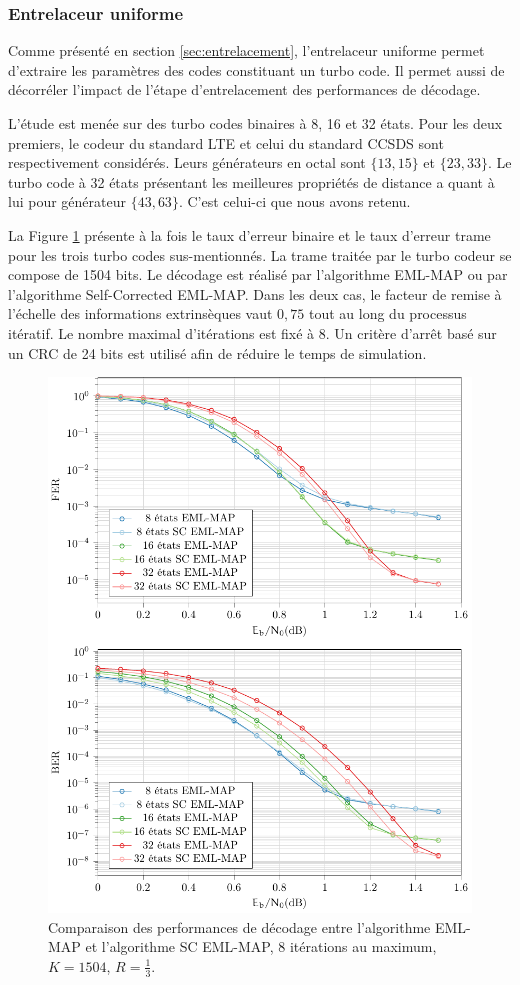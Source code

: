 \subsubsection{Entrelaceur uniforme}
Comme présenté en section \ref{sec:entrelacement}, l'entrelaceur uniforme permet d'extraire les paramètres des codes 
constituant un turbo code. Il permet aussi de décorréler l'impact de l'étape d'entrelacement des performances de 
décodage. 

L'étude est menée sur des turbo codes binaires à 8, 16 et 32 états. Pour les deux premiers, le codeur du standard LTE
et celui du standard CCSDS sont respectivement considérés. Leurs générateurs en octal sont $\{13,15\}$ et $\{23,33\}$. Le 
turbo code à 32 états présentant les meilleures propriétés de distance a quant à lui pour générateur $\{43,63\}$. C'est 
celui-ci que nous avons retenu.

La Figure \ref{fig:sc8it} présente à la fois le taux d'erreur binaire et le taux d'erreur trame pour les trois turbo 
codes sus-mentionnés. La trame traitée par le turbo codeur se compose de 1504 bits. Le décodage est réalisé par
l'algorithme EML-MAP ou par l’algorithme Self-Corrected EML-MAP.
Dans les deux cas, le facteur de remise à l'échelle des informations extrinsèques vaut $0,75$ tout au long du processus itératif.
Le nombre maximal d'itérations est fixé à 8. Un critère d'arrêt basé sur un CRC de 24 bits est utilisé afin de réduire le
temps de simulation.

\begin{figure}[!ht]
	\vspace*{-.2cm}
	\centering
	\includegraphics[width=.8\textwidth]{main/ch2_fig/tikz/sc_8it.pdf}
	\vspace*{-.1cm}
	\caption{Comparaison des performances de décodage entre l'algorithme EML-MAP et l'algorithme SC EML-MAP, 8 itérations au maximum, $K=1504$, $R=\frac{1}{3}$. \label{fig:sc8it}}
	\vspace*{-.1cm}
\end{figure}

